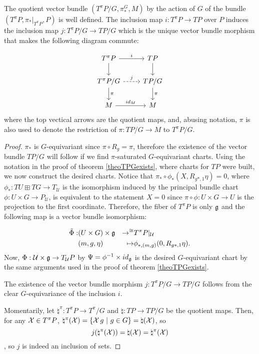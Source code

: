 \begin{theorem}\label{theoTpiPGSubbundle}
The quotient vector bundle $(T^\pi P/G, \pi^G_*, M)$ by the action of $G$ of the bundle $(T^\pi P, \pi_*|_{T^\pi P}, P)$ is well defined. The inclusion map $i: T^\pi P \to TP$ over $P$ induces the inclusion map $j: T^\pi P/G \to TP/G$ which is the unique vector bundle morphism that makes the following diagram commute:

\begin{equation}
    \begin{tikzcd}
        T^\pi P \ar{r}{i} \ar{d} & TP \ar{d} \\
        T^\pi P/G \ar[dashed]{r}{j} \arrow{d}{\pi} & TP/G \arrow{d}{\pi} \\
        M \arrow{r}{id_M} & M
    \end{tikzcd}
\end{equation}
where the top vectical arrows are the quotient maps, and, abusing notation, $\pi$ is also used to denote the restriction of $\pi: TP/G \to M$ to $T^\pi P/G$.
\end{theorem}

\begin{proof}
$\pi_*$ is $G$-equivariant since $\pi \circ R_g = \pi$, therefore the existence of the vector bundle $TP/G$ will follow if we find $\pi$-saturated $G$-equivariant charts. Using the notation in the proof of theorem \ref{theoTPGexists}, where charts for $TP$ were built, we now construct the desired charts. Notice that $\pi_* \circ \phi_* (X, R_{g*, 1} \eta) = 0$, where $\phi_* : TU \boxplus TG \to T_{\mathcal U}$ is the isomorphism induced by the principal bundle chart $\phi: U \times G \to P_{\mathcal U}$, is equivalent to the statement $X = 0$ since $\pi \circ \phi: U \times G \to U$ is the projection to the first coordinate. Therefore, the fiber of $T^\pi P$ is only $\mathfrak{g}$ and the following map is a vector bundle isomorphism:

\begin{align*}
    \tilde \Phi :& (U \times G) \times \alg g & \to^{\cong} & T^\pi P|_{\mathcal U} \\    
                 & (m, g, \eta) & \mapsto & \phi_{*, (m, g)}(0, R_{g*, 1} \eta).
\end{align*}
Now, $\Phi : \mathcal U \times \mathfrak{g}  \to  T_{\mathcal U}P$ by $\Psi = \phi^{-1} \times id_{\alg g}$ is the desired $G$-equivariant chart by the same arguments used in the proof of theorem \ref{theoTPGexists}.

The existence of the vector bundle morphism $j: T^\pi P/G \to TP/G$ follows from the clear $G$-equivariance of the inclusion $i$.

Momentarily, let $\natural^\pi: T^\pi P \to T^\pi/G$ and $\natural: TP \to TP/G$ be the quotient maps. Then, for any $\mathcal{X} \in T^\pi P$, $\natural^\pi(\mathcal{X}) = \left\{ \mathcal{X} \, g \ |\  g \in G \right\} = \natural(\mathcal{X})$, so \[j(\natural^\pi(\mathcal{X})) = \natural(\mathcal{X}) = \natural^\pi(\mathcal{X})\], so $j$ is indeed an inclusion of sets.
\end{proof}

